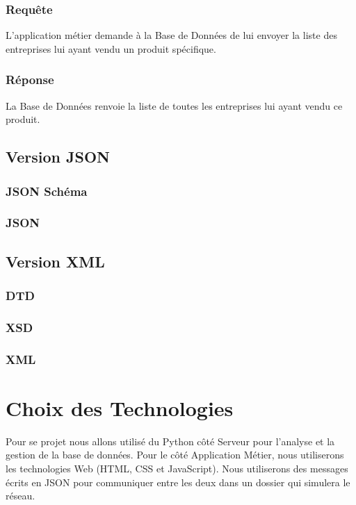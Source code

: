 \documentclass[a4paper, 11pt]{article}
\begin{document}
        \subsubsection{Requête} 
        L'application métier demande à la Base de Données de lui envoyer la liste des entreprises lui ayant vendu un produit spécifique.
        \subsubsection{Réponse}
        La Base de Données renvoie la liste de toutes les entreprises lui ayant vendu ce produit.
    \subsection{Version JSON}
        \subsubsection{JSON Schéma}
            
        \subsubsection{JSON}
    
    \subsection{Version XML}
        \subsubsection{DTD}
            
        \subsubsection{XSD}
            
        \subsubsection{XML}

\section{Choix des Technologies}
Pour se projet nous allons utilisé du Python côté Serveur pour l'analyse et la gestion de la base de données. Pour le côté Application Métier, nous utiliserons les technologies Web (HTML, CSS et JavaScript). Nous utiliserons des messages écrits en JSON pour communiquer entre les deux dans un dossier qui simulera le réseau.
\end{document}
